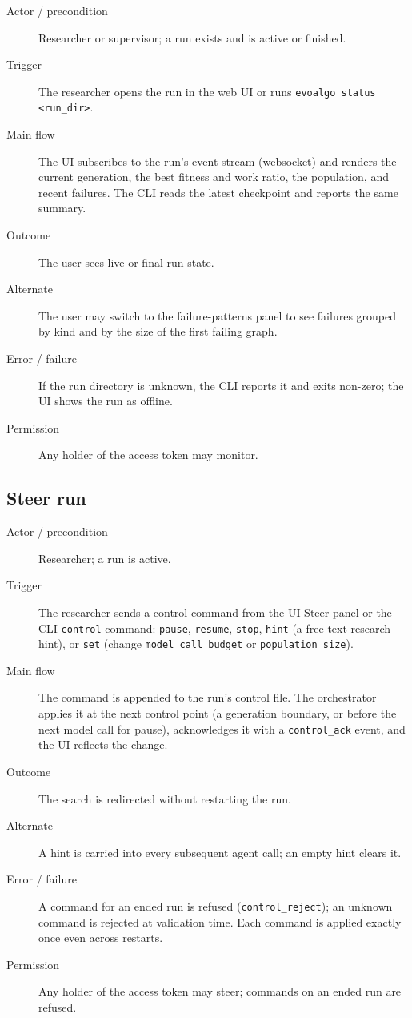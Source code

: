 \begin{description}
  \item[Actor / precondition] Researcher or supervisor; a run exists and is
  active or finished.
  \item[Trigger] The researcher opens the run in the web UI or runs
  \texttt{evoalgo status <run\_dir>}.
  \item[Main flow] The UI subscribes to the run's event stream (websocket) and
  renders the current generation, the best fitness and work ratio, the
  population, and recent failures. The CLI reads the latest checkpoint and
  reports the same summary.
  \item[Outcome] The user sees live or final run state.
  \item[Alternate] The user may switch to the failure-patterns panel to see
  failures grouped by kind and by the size of the first failing graph.
  \item[Error / failure] If the run directory is unknown, the CLI reports it
  and exits non-zero; the UI shows the run as offline.
  \item[Permission] Any holder of the access token may monitor.
\end{description}

\subsection{Steer run}

\begin{description}
  \item[Actor / precondition] Researcher; a run is active.
  \item[Trigger] The researcher sends a control command from the UI Steer panel
  or the CLI \texttt{control} command: \texttt{pause}, \texttt{resume},
  \texttt{stop}, \texttt{hint} (a free-text research hint), or \texttt{set}
  (change \texttt{model\_call\_budget} or \texttt{population\_size}).
  \item[Main flow] The command is appended to the run's control file. The
  orchestrator applies it at the next control point (a generation boundary, or
  before the next model call for pause), acknowledges it with a
  \texttt{control\_ack} event, and the UI reflects the change.
  \item[Outcome] The search is redirected without restarting the run.
  \item[Alternate] A hint is carried into every subsequent agent call; an empty
  hint clears it.
  \item[Error / failure] A command for an ended run is refused
  (\texttt{control\_reject}); an unknown command is rejected at validation
  time. Each command is applied exactly once even across restarts.
  \item[Permission] Any holder of the access token may steer; commands on an
  ended run are refused.
\end{description}

